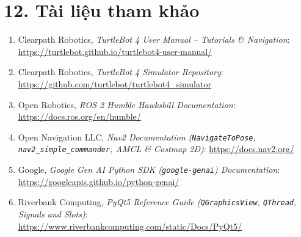 \section*{12. Tài liệu tham khảo}

\begin{enumerate}[leftmargin=1.2cm]
  \item Clearpath Robotics, \textit{TurtleBot 4 User Manual -- Tutorials \& Navigation}: \url{https://turtlebot.github.io/turtlebot4-user-manual/}
  \item Clearpath Robotics, \textit{TurtleBot 4 Simulator Repository}: \url{https://github.com/turtlebot/turtlebot4_simulator}
  \item Open Robotics, \textit{ROS 2 Humble Hawksbill Documentation}: \url{https://docs.ros.org/en/humble/}
  \item Open Navigation LLC, \textit{Nav2 Documentation (\texttt{NavigateToPose}, \texttt{nav2\_simple\_commander}, AMCL \& Costmap 2D)}: \url{https://docs.nav2.org/}
  \item Google, \textit{Google Gen AI Python SDK (\texttt{google-genai}) Documentation}: \url{https://googleapis.github.io/python-genai/}
  \item Riverbank Computing, \textit{PyQt5 Reference Guide (\texttt{QGraphicsView}, \texttt{QThread}, Signals and Slots)}: \url{https://www.riverbankcomputing.com/static/Docs/PyQt5/}
\end{enumerate}
